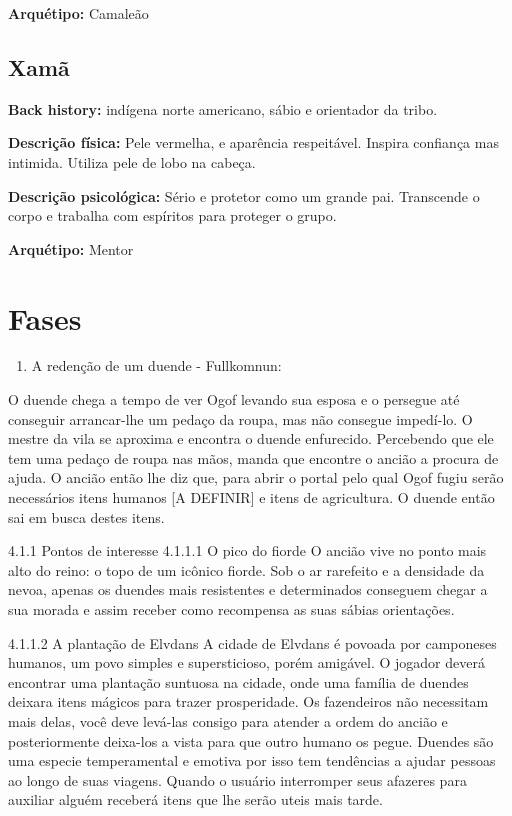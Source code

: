 \textbf{Arquétipo: }Camaleão

\subsection{Xamã}

\textbf{Back history: }indígena norte americano, sábio e orientador da tribo.

\textbf{Descrição física: }Pele vermelha, e aparência respeitável. Inspira confiança mas intimida. Utiliza pele de lobo na cabeça.

\textbf{Descrição psicológica:} Sério e protetor como um grande pai. Transcende o corpo e trabalha com espíritos para proteger o grupo.

\textbf{Arquétipo:} Mentor

\section{Fases}

\begin{enumerate}
\item A redenção de um duende - Fullkomnun: 
\end{enumerate}
O duende chega a tempo de ver Ogof levando sua esposa e o persegue até conseguir arrancar-lhe um pedaço da roupa, mas não consegue impedí-lo. O mestre da vila se aproxima e encontra o duende enfurecido. Percebendo que ele tem uma pedaço de roupa nas mãos,  manda que encontre o ancião a procura de ajuda. 
O ancião então lhe diz que, para abrir o portal pelo qual Ogof fugiu serão necessários itens humanos [A DEFINIR] e itens de agricultura. O duende então sai em busca destes itens.

	4.1.1 Pontos de interesse
    	4.1.1.1 O pico do fiorde
        	O  ancião vive no ponto mais alto do reino: o topo de um icônico fiorde. Sob o ar rarefeito e a densidade da nevoa, apenas os duendes mais resistentes e determinados conseguem chegar a sua morada e assim receber como recompensa as suas sábias orientações.
            
        4.1.1.2 A plantação de Elvdans
        	 A cidade de Elvdans é povoada por camponeses humanos, um povo simples e supersticioso, porém amigável. O jogador deverá encontrar uma plantação suntuosa na cidade, onde uma família de duendes deixara itens mágicos para trazer prosperidade. Os fazendeiros não necessitam mais delas, você deve levá-las consigo para atender a ordem do ancião e posteriormente deixa-los a vista para que outro humano os pegue. Duendes são uma especie temperamental e emotiva por isso tem tendências a ajudar pessoas ao longo de suas viagens. Quando o usuário interromper seus afazeres para auxiliar alguém receberá itens que lhe serão uteis mais tarde. 

